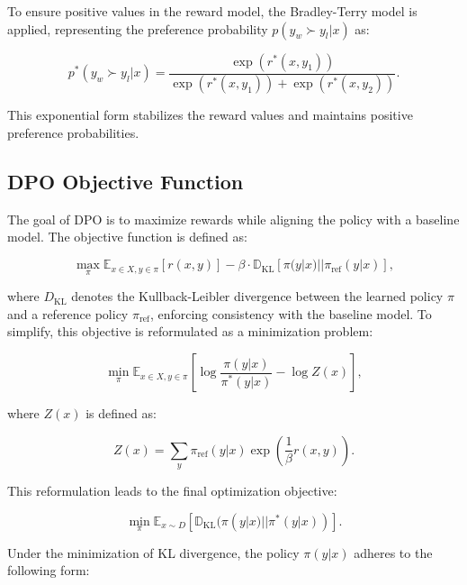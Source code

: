 To ensure positive values in the reward model, the Bradley-Terry model is applied, representing the preference probability \( p(y_w \succ y_l | x) \) as:

\begin{equation}
p^*(y_w \succ y_l | x) = \frac{\exp(r^*(x, y_1))}{\exp(r^*(x, y_1)) + \exp(r^*(x, y_2))}.
\end{equation}

This exponential form stabilizes the reward values and maintains positive preference probabilities.

\subsection{DPO Objective Function}
The goal of DPO is to maximize rewards while aligning the policy with a baseline model. The objective function is defined as:

\begin{equation}
\max_\pi \mathbb{E}_{x \in X, y \in \pi} \left[ r(x, y) \right] - \beta \cdot \mathbb{D}_{\text{KL}} \left[ \pi(y | x) || \pi_{\text{ref}}(y | x) \right],
\end{equation}

where \( D_{\text{KL}} \) denotes the Kullback-Leibler divergence between the learned policy \( \pi \) and a reference policy \( \pi_{\text{ref}} \), enforcing consistency with the baseline model. To simplify, this objective is reformulated as a minimization problem:

\begin{equation}
\min_\pi \mathbb{E}_{x \in X, y \in \pi} \left[ \log \frac{\pi(y | x)}{\pi^*(y | x)} - \log Z(x) \right],
\end{equation}

where \( Z(x) \) is defined as:

\begin{equation}
Z(x) = \sum_y \pi_{\text{ref}}(y | x) \exp \left( \frac{1}{\beta} r(x, y) \right).
\end{equation}

This reformulation leads to the final optimization objective:

\begin{equation}
\min_\pi \mathbb{E}_{x \sim D} \left[ \mathbb{D}_{\text{KL}}(\pi(y | x) || \pi^*(y | x)) \right].
\end{equation}

Under the minimization of KL divergence, the policy \( \pi(y | x) \) adheres to the following form:

